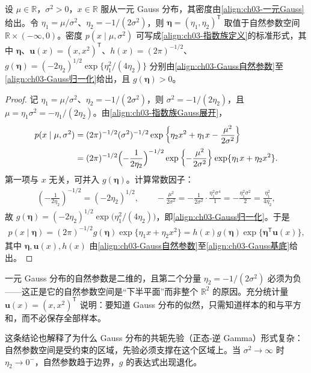 \documentclass[../../main.tex]{subfiles}
\begin{document}
\begin{proposition}\label{proposition:ch03-Gauss指数族}
设 $\mu\in\mathbb{R}$，$\sigma^{2}>0$，$x\in\mathbb{R}$ 服从一元 Gauss 分布，其密度由\eqref{align:ch03-一元Gauss}给出。令 $\eta_1=\mu/\sigma^{2}$、$\eta_2=-1/(2\sigma^{2})$，则 $\boldsymbol{\eta}=(\eta_1,\eta_2)^{\mathsf{T}}$ 取值于自然参数空间 $\mathbb{R}\times(-\infty,0)$。密度 $p(x\mid\mu,\sigma^{2})$ 可写成\eqref{align:ch03-指数族定义}的标准形式，其中 $\boldsymbol{\eta}$、$\boldsymbol{u}(x)=(x,x^{2})^{\mathsf{T}}$、$h(x)=(2\pi)^{-1/2}$、$g(\boldsymbol{\eta})=(-2\eta_2)^{1/2}\exp\{\eta_1^{2}/(4\eta_2)\}$ 分别由\eqref{align:ch03-Gauss自然参数}至\eqref{align:ch03-Gauss归一化}给出，且 $g(\boldsymbol{\eta})>0$。
\end{proposition}
\begin{proof}
记 $\eta_1=\mu/\sigma^{2}$、$\eta_2=-1/(2\sigma^{2})$，则 $\sigma^{2}=-1/(2\eta_2)$，且 $\mu=\eta_1\sigma^{2}=-\eta_1/(2\eta_2)$。由\eqref{align:ch03-指数族Gauss展开}，
\begin{align*}
p(x\mid\mu,\sigma^{2})&=(2\pi)^{-1/2}(\sigma^{2})^{-1/2}\exp\left\{\eta_2x^{2}+\eta_1x-\frac{\mu^{2}}{2\sigma^{2}}\right\}\\
&=(2\pi)^{-1/2}\Bigl(-\frac{1}{2\eta_2}\Bigr)^{-1/2}\exp\left\{-\frac{\mu^{2}}{2\sigma^{2}}\right\}\exp\{\eta_1x+\eta_2x^{2}\}.
\end{align*}
第一项与 $x$ 无关，可并入 $g(\boldsymbol{\eta})$。计算常数因子：
\begin{align*}
(-\tfrac{1}{2\eta_2})^{-1/2}=(-2\eta_2)^{1/2},\qquad -\frac{\mu^{2}}{2\sigma^{2}}=-\frac{1}{2\sigma^{2}}\cdot\frac{\eta_1^{2}\sigma^{4}}{1}=-\frac{\eta_1^{2}\sigma^{2}}{2}=\frac{\eta_1^{2}}{4\eta_2},
\end{align*}
故 $g(\boldsymbol{\eta})=(-2\eta_2)^{1/2}\exp\bigl(\eta_1^{2}/(4\eta_2)\bigr)$，即\eqref{align:ch03-Gauss归一化}。于是
\begin{align*}
p(x\mid\boldsymbol{\eta})=(2\pi)^{-1/2}g(\boldsymbol{\eta})\exp\{\eta_1x+\eta_2x^{2}\}=h(x)g(\boldsymbol{\eta})\exp\{\boldsymbol{\eta}^{\mathsf{T}}\boldsymbol{u}(x)\},
\end{align*}
其中 $\boldsymbol{\eta},\boldsymbol{u}(x),h(x)$ 由\eqref{align:ch03-Gauss自然参数}至\eqref{align:ch03-Gauss基底}给出。
\end{proof}

\begin{remark}
一元 Gauss 分布的自然参数是二维的，且第二个分量 $\eta_2=-1/(2\sigma^{2})$ 必须为负——这正是它的自然参数空间是“下半平面”而非整个 $\mathbb{R}^{2}$ 的原因。充分统计量 $\boldsymbol{u}(x)=(x,x^{2})^{\mathsf{T}}$ 说明：要知道 Gauss 分布的似然，只需知道样本的和与平方和，而不必保存全部样本。

这条结论也解释了为什么 Gauss 分布的共轭先验（正态-逆 Gamma）形式复杂：自然参数空间是受约束的区域，先验必须支撑在这个区域上。当 $\sigma^{2}\to\infty$ 时 $\eta_2\to0^{-}$，自然参数趋于边界，$g$ 的表达式出现退化。
\end{remark}
\end{document}
